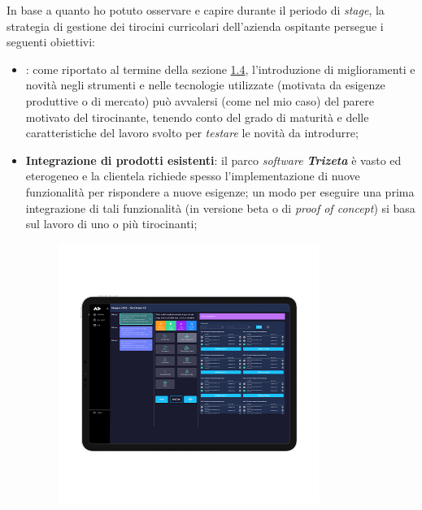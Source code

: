 In base a quanto ho potuto osservare e capire durante il periodo di \textit{stage}, la strategia di gestione dei tirocini curricolari dell'azienda ospitante persegue i seguenti obiettivi:
\begin{itemize}
    \item {}: come riportato al termine della sezione \hyperref[sec:innovazione]{1.4}, l'introduzione di miglioramenti e novità negli strumenti e nelle tecnologie utilizzate (motivata da esigenze produttive o di mercato)
    può avvalersi (come nel mio caso) del parere motivato del tirocinante, tenendo conto del grado di maturità e delle caratteristiche del lavoro svolto per \textit{testare} le novità da introdurre;
    \item \textbf{Integrazione di prodotti esistenti}: il parco \textit{software \textbf{Trizeta}} è vasto ed eterogeneo e la clientela richiede spesso l'implementazione di nuove funzionalità per rispondere a nuove esigenze; un modo per eseguire
        una prima integrazione di tali funzionalità (in versione beta o di \textit{proof of concept}) si basa sul lavoro di uno o più tirocinanti;
        \vspace{-20mm}
        \begin{figure}[H]
            \centering
            \includegraphics[width=0.8\textwidth]{images/ademes.png}

\end{figure}
\end{itemize}
